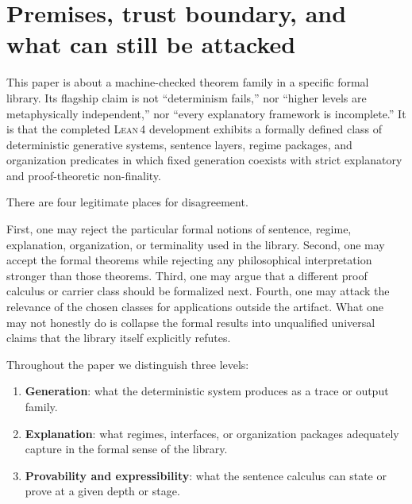 \documentclass[11pt,a4paper]{article}
\newenvironment{keybox}[1]{%
  \Needspace*{8\baselineskip}%
  \begin{tcolorbox}[
    enhanced, breakable=false,
    colback=blue!5, colframe=blue!45!black, coltitle=black,
    colbacktitle=blue!14, boxrule=0.85pt, arc=2.5pt,
    left=9pt, right=9pt, top=6pt, bottom=6pt,
    titlerule=0.55pt, fonttitle=\bfseries, title={#1},
    before upper=\raggedright,
    before skip=0.9\baselineskip, after skip=0.9\baselineskip
  ]%
}{%
  \end{tcolorbox}%
}
\theoremstyle{definition}
\newcommand{\lean}{\textsc{Lean}\,4}
\begin{document}
\tableofcontents
\bigskip

\section{Premises, trust boundary, and what can still be attacked}\label{sec:trust}

\begin{keybox}{What this paper is actually claiming}
This paper is about a machine-checked theorem family in a specific formal library. Its flagship claim is not ``determinism fails,'' nor ``higher levels are metaphysically independent,'' nor ``every explanatory framework is incomplete.'' It is that the completed \lean{} development exhibits a formally defined class of deterministic generative systems, sentence layers, regime packages, and organization predicates in which fixed generation coexists with strict explanatory and proof-theoretic non-finality.
\end{keybox}

\begin{keybox}{Where disagreement can live}
There are four legitimate places for disagreement.

First, one may reject the particular formal notions of sentence, regime, explanation, organization, or terminality used in the library. Second, one may accept the formal theorems while rejecting any philosophical interpretation stronger than those theorems. Third, one may argue that a different proof calculus or carrier class should be formalized next. Fourth, one may attack the relevance of the chosen classes for applications outside the artifact. What one may not honestly do is collapse the formal results into unqualified universal claims that the library itself explicitly refutes.
\end{keybox}

\noindent
Throughout the paper we distinguish three levels:

\begin{enumerate}[leftmargin=2em]
\item \textbf{Generation}: what the deterministic system produces as a trace or output family.
\item \textbf{Explanation}: what regimes, interfaces, or organization packages adequately capture in the formal sense of the library.
\item \textbf{Provability and expressibility}: what the sentence calculus can state or prove at a given depth or stage.
\end{enumerate}
\end{document}
